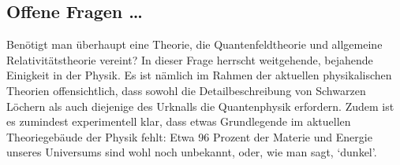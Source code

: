 \subsection*{Offene Fragen \dots}

Benötigt man überhaupt eine Theorie, die Quantenfeldtheorie und allgemeine Relativitätstheorie vereint? In dieser Frage herrscht weitgehende, bejahende Einigkeit in der Physik. Es ist nämlich im Rahmen der aktuellen physikalischen Theorien offensichtlich, dass sowohl die Detailbeschreibung von Schwarzen Löchern als auch diejenige des Urknalls die Quantenphysik erfordern. Zudem ist es zumindest experimentell klar, dass etwas Grundlegende im aktuellen Theoriegebäude der Physik fehlt: Etwa 96 Prozent der Materie und Energie unseres Universums sind wohl noch unbekannt, oder, wie man sagt, \enquote*{dunkel}.
